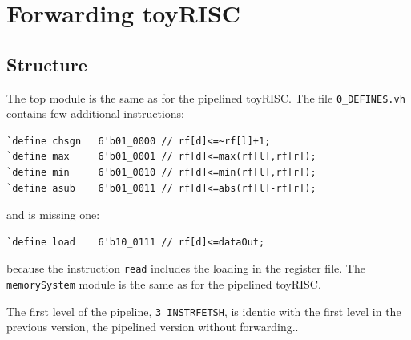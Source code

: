 \newpage

\section{Forwarding toyRISC}

\subsection{Structure}

The top module is the same as for the pipelined toyRISC. The file {\tt 0\_DEFINES.vh} contains few additional instructions:
\begin{verbatim}
`define chsgn	6'b01_0000 // rf[d]<=~rf[l]+1;
`define max		6'b01_0001 // rf[d]<=max(rf[l],rf[r]);
`define min		6'b01_0010 // rf[d]<=min(rf[l],rf[r]);
`define asub	6'b01_0011 // rf[d]<=abs(rf[l]-rf[r]);
\end{verbatim}
and is missing one:
\begin{verbatim}
`define load   	6'b10_0111 // rf[d]<=dataOut;
\end{verbatim}
because the instruction {\tt read} includes the loading in the register file. The {\tt memorySystem} module is the same as for the pipelined toyRISC. 




The first level of the pipeline, {\tt 3\_INSTRFETSH}, is identic with the first level in the previous version, the pipelined version without forwarding..


